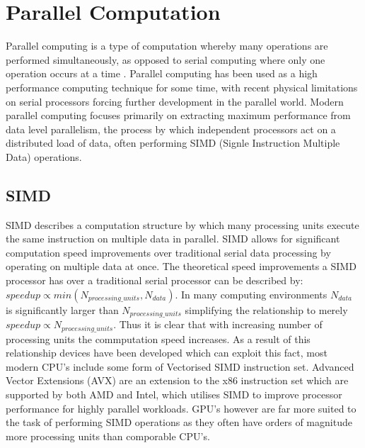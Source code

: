 
\section{Parallel Computation} %
Parallel computing is a type of computation whereby many operations are performed simultaneously, as
opposed to serial computing where only one operation occurs at a time \cite{wikiRef1}. Parallel
computing has been used as a high performance computing technique for some time, with recent
physical limitations on serial processors forcing further development in the parallel world.
Modern parallel computing focuses primarily on extracting maximum performance from data level
parallelism, the process by which independent processors act on a distributed load of data, often
performing SIMD (Signle Instruction Multiple Data) operations. 

\subsection{SIMD}
SIMD describes a computation structure by which many processing units execute the same instruction
on multiple data in parallel. SIMD allows for significant computation speed improvements over
traditional serial data processing by operating on multiple data at once. The theoretical speed
improvements a SIMD processor has over a traditional serial processor can be described by: $ speedup \propto
min\left(N_{processing\_units}, N_{data}\right) $. In many computing environments $N_{data}$ is
significantly larger than $N_{processing\_units}$ simplifying the relationship to merely $ speedup
\propto N_{processing\_units}$. Thus it is clear that with increasing number of processing units the
commputation speed increases. As a result of this relationship devices have been developed which can
exploit this fact, most modern CPU's include some form of Vectorised SIMD instruction set. Advanced
Vector Extensions (AVX) are an extension to the x86 instruction set which are supported by both AMD
and Intel, which utilises SIMD to improve processor performance for highly parallel workloads. GPU's
however are far more suited to the task of performing SIMD operations as they often have orders of
magnitude more processing units than comporable CPU's.

